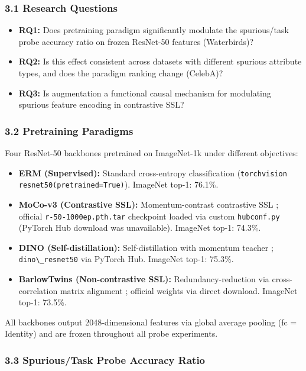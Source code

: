
\subsubsection{3.1 Research Questions}

\begin{itemize}
\item \textbf{RQ1:} Does pretraining paradigm significantly modulate the spurious/task probe accuracy ratio on frozen ResNet-50 features (Waterbirds)?
\item \textbf{RQ2:} Is this effect consistent across datasets with different spurious attribute types, and does the paradigm ranking change (CelebA)?
\item \textbf{RQ3:} Is augmentation a functional causal mechanism for modulating spurious feature encoding in contrastive SSL?
\end{itemize}

\subsubsection{3.2 Pretraining Paradigms}

Four ResNet-50 backbones pretrained on ImageNet-1k under different objectives:

\begin{itemize}
\item \textbf{ERM (Supervised):} Standard cross-entropy classification (\texttt{torchvision resnet50(pretrained=True)}). ImageNet top-1: 76.1\%.
\item \textbf{MoCo-v3 (Contrastive SSL):} Momentum-contrast contrastive SSL \citep{He2020MoCo}; official \texttt{r-50-1000ep.pth.tar} checkpoint loaded via custom \texttt{hubconf.py} (PyTorch Hub download was unavailable). ImageNet top-1: 74.3\%.
\item \textbf{DINO (Self-distillation):} Self-distillation with momentum teacher \citep{Caron2021DINO}; \texttt{dino\textbackslash \_resnet50} via PyTorch Hub. ImageNet top-1: 75.3\%.
\item \textbf{BarlowTwins (Non-contrastive SSL):} Redundancy-reduction via cross-correlation matrix alignment \citep{Zbontar2021BarlowTwins}; official weights via direct download. ImageNet top-1: 73.5\%.
\end{itemize}

All backbones output 2048-dimensional features via global average pooling (fc = Identity) and are frozen throughout all probe experiments.

\subsubsection{3.3 Spurious/Task Probe Accuracy Ratio}

